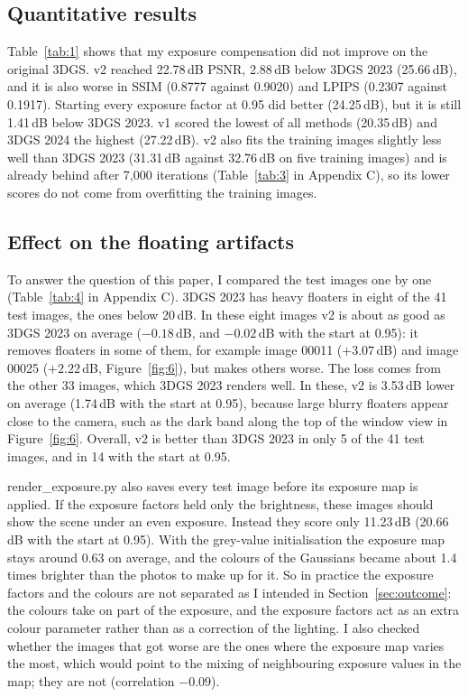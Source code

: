 \documentclass[11pt,a4paper]{article}
\begin{document}
\subsection{Quantitative results}

Table~\ref{tab:1} shows that my exposure compensation did not improve on the original 3DGS. v2 reached 22.78\,dB PSNR, 2.88\,dB below 3DGS 2023 (25.66\,dB), and it is also worse in SSIM (0.8777 against 0.9020) and LPIPS (0.2307 against 0.1917). Starting every exposure factor at 0.95 did better (24.25\,dB), but it is still 1.41\,dB below 3DGS 2023. v1 scored the lowest of all methods (20.35\,dB) and 3DGS 2024 the highest (27.22\,dB). v2 also fits the training images slightly less well than 3DGS 2023 (31.31\,dB against 32.76\,dB on five training images) and is already behind after 7,000 iterations (Table~\ref{tab:3} in Appendix C), so its lower scores do not come from overfitting the training images.

\subsection{Effect on the floating artifacts}

To answer the question of this paper, I compared the test images one by one (Table~\ref{tab:4} in Appendix C). 3DGS 2023 has heavy floaters in eight of the 41 test images, the ones below 20\,dB. In these eight images v2 is about as good as 3DGS 2023 on average ($-0.18$\,dB, and $-0.02$\,dB with the start at 0.95): it removes floaters in some of them, for example image 00011 ($+3.07$\,dB) and image 00025 ($+2.22$\,dB, Figure~\ref{fig:6}), but makes others worse. The loss comes from the other 33 images, which 3DGS 2023 renders well. In these, v2 is 3.53\,dB lower on average (1.74\,dB with the start at 0.95), because large blurry floaters appear close to the camera, such as the dark band along the top of the window view in Figure~\ref{fig:6}. Overall, v2 is better than 3DGS 2023 in only 5 of the 41 test images, and in 14 with the start at 0.95.

render\_exposure.py also saves every test image before its exposure map is applied. If the exposure factors held only the brightness, these images should show the scene under an even exposure. Instead they score only 11.23\,dB (20.66\,dB with the start at 0.95). With the grey-value initialisation the exposure map stays around 0.63 on average, and the colours of the Gaussians became about 1.4 times brighter than the photos to make up for it. So in practice the exposure factors and the colours are not separated as I intended in Section~\ref{sec:outcome}: the colours take on part of the exposure, and the exposure factors act as an extra colour parameter rather than as a correction of the lighting. I also checked whether the images that got worse are the ones where the exposure map varies the most, which would point to the mixing of neighbouring exposure values in the map; they are not (correlation $-0.09$).
\end{document}
